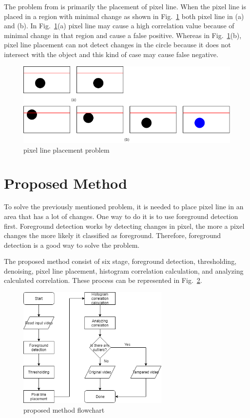 \documentclass[conference]{IEEEtran}
\begin{document}
The problem from \cite{b2} is primarily the placement of pixel line. When the pixel line is placed in a region with minimal change as shown in Fig.~\ref{problem1} both pixel line in (a) and (b). In Fig.~\ref{problem1}(a) pixel line may cause a high correlation value because of minimal change in that region and cause a false positive. Whereas in Fig.~\ref{problem1}(b), pixel line placement can not detect changes in the circle because it does not intersect with the object and this kind of case may cause false negative.

\begin{figure}[htbp]
\centerline{\includegraphics[width=0.9\linewidth]{problem1.PNG}}
\caption{pixel line placement problem}
\label{problem1}
\end{figure}

\section{Proposed Method}
To solve the previously mentioned problem, it is needed to place pixel line in an area that has a lot of changes. One way to do it is to use foreground detection first. Foreground detection works by detecting changes in pixel, the more a pixel changes the more likely it classified as foreground. Therefore, foreground detection is a good way to solve the problem.

The proposed method consist of six stage, foreground detection, thresholding, denoising, pixel line placement, histogram correlation calculation, and analyzing calculated correlation. These process can be represented in Fig.~\ref{sysflow}.

\begin{figure}[htbp]
\centerline{\includegraphics[width=75mm,scale=0.5]{sysflow.png}}
\caption{proposed method flowchart}
\label{sysflow}
\end{figure}
\end{document}
